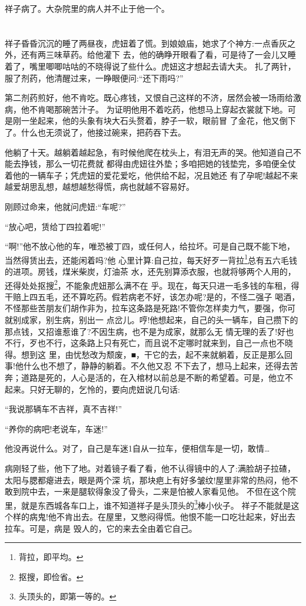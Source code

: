 \documentclass[11pt,a4paper,onecolumn]{article}
\begin{document}
祥子病了。大杂院里的病人并不止于他一个。

\pagebreak
\section{}

祥子昏昏沉沉的睡了两昼夜，虎妞着了慌。到娘娘庙，她求了个神方:一点香灰之外，还有两三味草药。给他灌下
去，他的确睁开眼看了看，可是待了一会儿又睡着了，嘴里唧唧咕咕的不晓得说了些什么。虎妞这才想起去请大夫。
扎了两针，服了剂药，他清醒过来，一睁眼便问:``还下雨吗?''

第二剂药煎好，他不肯吃。既心疼钱，又恨自己这样的不济，居然会被一场雨给激病，他不肯喝那碗苦汁子。
为证明他用不着吃药，他想马上穿起衣裳就下地。可是刚一坐起来，他的头象有块大石头赘着，脖子一软，眼前冒
了金花，他又倒下了。什么也无须说了，他接过碗来，把药吞下去。

他躺了十天。越躺着越起急，有时候他爬在枕头上，有泪无声的哭。他知道自己不能去挣钱，那么一切花费就
都得由虎妞往外垫；多咱把她的钱垫完，多咱便全仗着他的一辆车子；凭虎妞的爱花爱吃，他供给不起，况且她还
有了孕呢!越起不来越爱胡思乱想，越想越愁得慌，病也就越不容易好。

刚顾过命来，他就问虎妞:``车呢?''

``放心吧，赁给丁四拉着呢!''

``啊!''他不放心他的车，唯恐被丁四，或任何人，给拉坏。可是自己既不能下地，当然得赁出去，还能闲着吗?他
心里计算:自己拉，每天好歹一背拉\footnote{背拉，即平均。}总有五六毛钱的进项。房钱，煤米柴炭，灯油茶
水，还先别算添衣服，也就将够两个人用的，还得处处抠搜\footnote{抠搜，即俭省。}，不能象虎妞那么满不在
乎。现在，每天只进一毛多钱的车租，得干赔上四五毛，还不算吃药。假若病老不好，该怎办呢?是的，不怪二强子
喝酒，不怪那些苦朋友们胡作非为，拉车这条路是死路!不管你怎样卖力气，要强，你可就别成家，别生病，别出一
点岔儿。哼!他想起来，自己的头一辆车，自己攒下的那点钱，又招谁惹谁了?不因生病，也不是为成家，就那么无
情无理的丢了!好也不行，歹也不行，这条路上只有死亡，而且说不定哪时就来到，自己一点也不晓得。想到这
里，由忧愁改为颓废，■，干它的去，起不来就躺着，反正是那么回事!他什么也不想了，静静的躺着。不久他又忍
不下去了，想马上起来，还得去苦奔；道路是死的，人心是活的，在入棺材以前总是不断的希望着。可是，他立不
起来。只好无聊的，乞怜的，要向虎妞说几句话:

``我说那辆车不吉祥，真不吉祥!''

``养你的病吧!老说车，车迷!''

他没再说什么。对了，自己是车迷1自从一拉车，便相信车是一切，敢情\ldots 

病刚轻了些，他下了地。对着镜子看了看，他不认得镜中的人了:满脸胡子拉碴，太阳与腮都瘪进去，眼是两个深
坑，那块疤上有好多皱纹!屋里非常的热闷，他不敢到院中去，一来是腿软得象没了骨头，二来是怕被人家看见他。
不但在这个院里，就是东西城各车口上，谁不知道祥子是头顶头的\footnote{头顶头的，即第一等的。}棒小伙子。
祥子不能就是这个样的病鬼!他不肯出去。在屋里，又憋闷得慌。他恨不能一口吃壮起来，好出去拉车。可是，病是
毁人的，它的来去全由着它自己。
\end{document}
